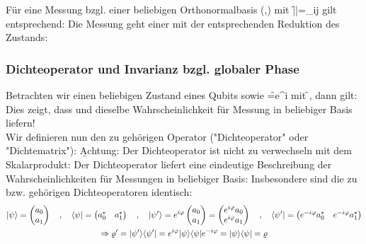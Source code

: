 Für eine Messung bzgl. einer beliebigen Orthonormalbasis (,) mit \f{||=\delta_{ij}} gilt entsprechend:
Die Messung geht einer mit der entsprechenden Reduktion des Zustands:

\subsubsection*{Dichteoperator und Invarianz bzgl. globaler Phase}
Betrachten wir einen beliebigen Zustand \ket{\psi} eines Qubits sowie \f{\cket{\psi^\prime}=e^{i\varphi}\cket{\psi}} mit \f{\varphi\in{}}, dann gilt:
Dies zeigt, dass \ket{\psi} und \ket{\psi^\prime} dieselbe Wahrscheinlichkeit für Messung in beliebiger Basis liefern!\\
Wir definieren nun den zu \ket{\psi} gehörigen Operator ("Dichteoperator" oder "Dichtematrix"):
\b{Achtung:} Der Dichteoperator ist nicht zu verwechseln mit dem Skalarprodukt:
Der Dichteoperator liefert eine eindeutige Beschreibung der Wahrscheinlichkeiten für Messungen in beliebiger Basis:
Insbesondere sind die zu \ket{\psi} bzw. \ket{\psi^\prime} gehörigen Dichteoperatoren identisch:
\begin{gather*}
    |\psi\rangle = \begin{pmatrix}a_0\\a_1\end{pmatrix}\quad,\quad\langle\psi|=\begin{pmatrix}a_0^*&a_1^*\end{pmatrix}\quad,\quad|\psi^\prime\rangle=e^{i\varphi}\begin{pmatrix}a_0\\a_1\end{pmatrix}=\begin{pmatrix}e^{i\varphi} a_0\\e^{i\varphi} a_1\end{pmatrix}\quad,\quad\langle\psi^\prime|=\begin{pmatrix}e^{-i\varphi}a_0^* & e^{-i\varphi}a_1^*\end{pmatrix}\\
    \Rightarrow \varrho^\prime = |\psi^\prime\rangle\langle\psi^\prime| = e^{i\varphi}|\psi\rangle\langle\psi|e^{-i\varphi} = |\psi\rangle\langle\psi| = \varrho
\end{gather*}


